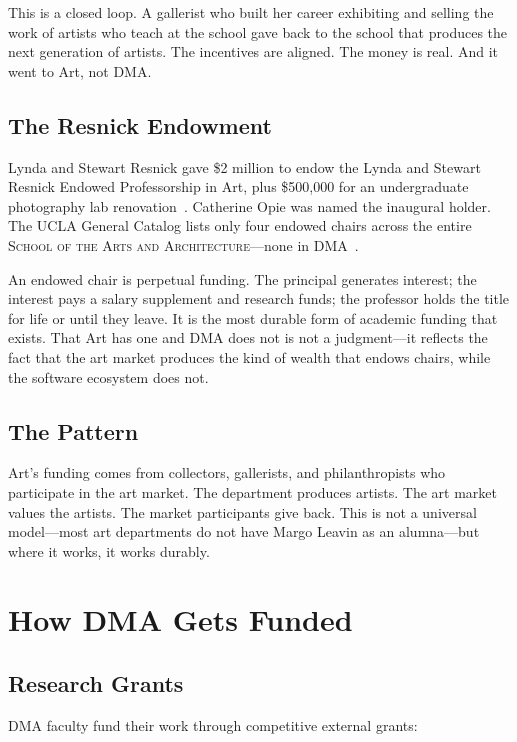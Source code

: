 \documentclass[10pt,letterpaper,twocolumn]{article}
\newcommand{\dma}{\textsc{DMA}}
\newcommand{\sofa}{\textsc{School of the Arts and Architecture}}
\begin{document}
This is a closed loop. A gallerist who built her career exhibiting and selling the work of artists who teach at the school gave back to the school that produces the next generation of artists. The incentives are aligned. The money is real. And it went to Art, not \dma{}.

\subsection{The Resnick Endowment}

Lynda and Stewart Resnick gave \$2 million to endow the Lynda and Stewart Resnick Endowed Professorship in Art, plus \$500,000 for an undergraduate photography lab renovation~\citep{resnickchair2019}. Catherine Opie was named the inaugural holder. The UCLA General Catalog lists only four endowed chairs across the entire \sofa{}---none in \dma{}~\citep{uclaendowedchairs}.

An endowed chair is perpetual funding. The principal generates interest; the interest pays a salary supplement and research funds; the professor holds the title for life or until they leave. It is the most durable form of academic funding that exists. That Art has one and \dma{} does not is not a judgment---it reflects the fact that the art market produces the kind of wealth that endows chairs, while the software ecosystem does not.

\subsection{The Pattern}

Art's funding comes from collectors, gallerists, and philanthropists who participate in the art market. The department produces artists. The art market values the artists. The market participants give back. This is not a universal model---most art departments do not have Margo Leavin as an alumna---but where it works, it works durably.

\section{How DMA Gets Funded}

\subsection{Research Grants}

\dma{} faculty fund their work through competitive external grants:
\end{document}
